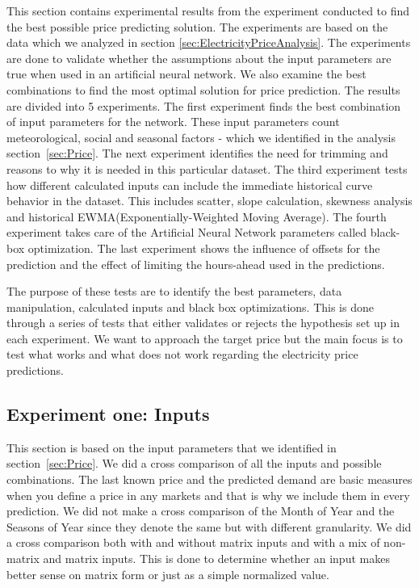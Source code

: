 This section contains experimental results from the experiment conducted to find the best possible price predicting solution. The experiments are based on the data which we analyzed in section \ref{sec:ElectricityPriceAnalysis}. The experiments are done to validate whether the assumptions about the input parameters are true when used in an artificial neural network. We also examine the best combinations to find the most optimal solution for price prediction. The results are divided into 5 experiments. The first experiment finds the best combination of input parameters for the network. These input parameters count meteorological, social and seasonal factors - which we identified in the analysis section~\ref{sec:Price}. The next experiment identifies the need for trimming and reasons to why it is needed in this particular dataset. The third experiment tests how different calculated inputs can include the immediate historical curve behavior in the dataset. This includes scatter, slope calculation, skewness analysis and historical EWMA(Exponentially-Weighted Moving Average). The fourth experiment takes care of the Artificial Neural Network parameters called black-box optimization. The last experiment shows the influence of offsets for the prediction and the effect of limiting the hours-ahead used in the predictions.

The purpose of these tests are to identify the best parameters, data manipulation, calculated inputs and black box optimizations. This is done through a series of tests that either validates or rejects the hypothesis set up in each experiment. We want to approach the target price but the main focus is to test what works and what does not work regarding the electricity price predictions.


\subsection{Experiment one: Inputs}
\label{sec:priceExperimentOne}
This section is based on the input parameters that we identified in section~\ref{sec:Price}. We did a cross comparison of all the inputs and possible combinations. The last known price and the predicted demand are basic measures when you define a price in any markets and that is why we include them in every prediction. We did not make a cross comparison of the Month of Year and the Seasons of Year since they denote the same but with different granularity. We did a cross comparison both with and without matrix inputs and with a mix of non-matrix and matrix inputs. This is done to determine whether an input makes better sense on matrix form or just as a simple normalized value. 

